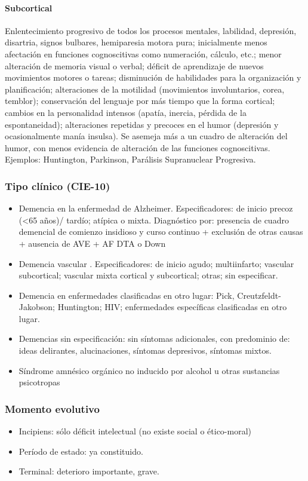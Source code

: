 \documentclass{scrbook}
\begin{document}
\paragraph{Subcortical} Enlentecimiento progresivo de todos los procesos mentales, labilidad, depresión, disartria, signos bulbares, hemiparesia motora pura; inicialmente menos afectación en funciones cognoscitivas como numeración, cálculo, etc.; menor alteración de memoria visual o verbal; déficit de aprendizaje de nuevos movimientos motores o tareas; disminución de habilidades para la organización y planificación; alteraciones de la motilidad (movimientos involuntarios, corea, temblor); conservación del lenguaje por más tiempo que la forma cortical; cambios en la personalidad intensos (apatía, inercia, pérdida de la espontaneidad); alteraciones repetidas y precoces en el humor (depresión y ocasionalmente manía insulsa). Se asemeja más a un cuadro de alteración del humor, con menos evidencia de alteración de las funciones cognoscitivas. Ejemplos: Huntington, Parkinson, Parálisis Supranuclear Progresiva.
\subsubsection*{Tipo clínico (CIE-10)}
\begin{itemize}
	\item Demencia en la enfermedad de Alzheimer. Especificadores: de inicio precoz (<65 años)/ tardío; atípica o mixta. Diagnóstico por: presencia de cuadro demencial de comienzo insidioso y curso continuo + exclusión de otras causas + ausencia de AVE + AF DTA o Down
	\item Demencia vascular . Especificadores: de inicio agudo; multiinfarto; vascular subcortical; vascular mixta cortical y subcortical; otras; sin especificar.
	\item Demencia en enfermedades clasificadas en otro lugar: Pick, Creutzfeldt-Jakobson; Huntington; HIV; enfermedades específicas clasificadas en otro lugar.
	\item Demencias sin especificación: sin síntomas adicionales, con predominio de: ideas delirantes, alucinaciones, síntomas depresivos, síntomas mixtos.
	\item Síndrome amnésico orgánico no inducido por alcohol u otras sustancias psicotropas
\end{itemize}
\subsubsection*{Momento evolutivo}
\begin{itemize}
	\item Incipiens: sólo déficit intelectual (no existe social o ético-moral)
	\item Período de estado: ya constituido.
	\item Terminal: deterioro importante, grave.
\end{itemize}
\end{document}
